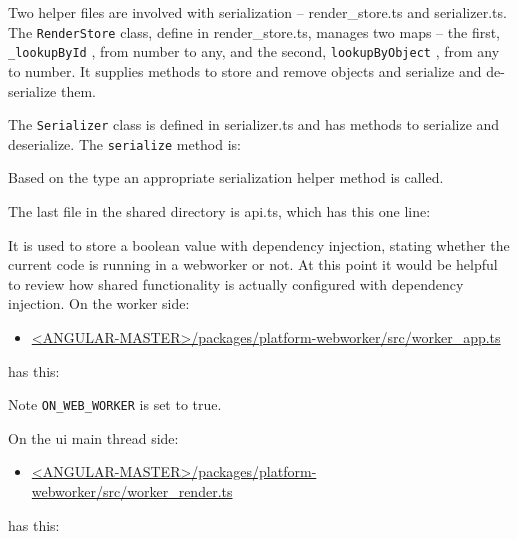 

Two helper files are involved with serialization – render\_store.ts and serializer.ts. The
\texttt{RenderStore}
class, define in render\_store.ts, manages two maps – the first,
\texttt{\_lookupById}
, from number to any, and the second,
\texttt{lookupByObject}
, from any to
number. It supplies methods to store and remove objects and serialize and de-
serialize them.

The
\texttt{Serializer}
class is defined in serializer.ts and has methods to serialize and
deserialize. The
\texttt{serialize}
method is:



Based on the type an appropriate serialization helper method is called.

The last file in the shared directory is api.ts, which has this one line:



It is used to store a boolean value with dependency injection, stating whether the
current code is running in a webworker or not. At this point it would be helpful to
review how shared functionality is actually configured with dependency injection. On
the worker side:

\begin{itemize}
  \item \href{https://github.com/angular/angular/blob/master/packages/platform-webworker/src/worker_app.ts}
        {<ANGULAR-MASTER>/packages/platform-webworker/src/worker\_app.ts}
\end{itemize}

has this:



Note
\texttt{ON\_WEB\_WORKER}
is set to true.

On the ui main thread side:

\begin{itemize}
  \item \href{https://github.com/angular/angular/blob/master/packages/platform-webworker/src/worker_render.ts}
        {<ANGULAR-MASTER>/packages/platform-webworker/src/worker\_render.ts}
\end{itemize}

has this:



